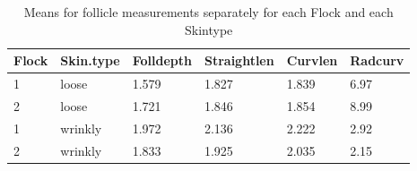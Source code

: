 %

\begin{table}[ht]
\centering
\caption{Means for follicle measurements separately for each Flock and each Skintype}
\label{tab:means}
\vspace{0.1in}
\begin{tabular}{|p{0.5in}|p{0.6in}|p{0.6in}|p{0.6in}|p{0.6in}|p{0.6in}|} \hline
  Flock & Skin.type & Folldepth & Straightlen & Curvlen  & Radcurv\\   
    \hline
  1 & loose & 1.579 & 1.827 & 1.839 & 6.97  \\ 
  2 & loose & 1.721 & 1.846 & 1.854 & 8.99  \\ 
  1 & wrinkly & 1.972 & 2.136 & 2.222 & 2.92 \\ 
  2 & wrinkly & 1.833 & 1.925 & 2.035 & 2.15  \\ 
   \hline
\end{tabular}
\end{table}

%


